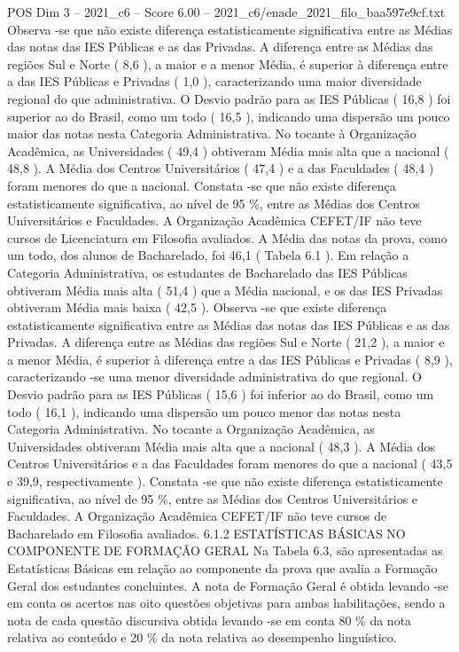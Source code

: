 \begin{textsample}{POS Dim 3 – 2021\_c6 – Score 6.00 – 2021\_c6/enade\_2021\_filo\_baa597e9cf.txt}
Observa -se que não existe diferença estatisticamente significativa entre as Médias das notas das IES Públicas e as das Privadas.
A diferença entre as Médias das regiões Sul e Norte ( 8,6 ), a maior e a menor Média, é superior à diferença entre a das IES Públicas e Privadas ( 1,0 ), caracterizando uma maior diversidade regional do que administrativa.
O Desvio padrão para as IES Públicas ( 16,8 ) foi superior ao do Brasil, como um todo ( 16,5 ), indicando uma dispersão um pouco maior das notas nesta Categoria Administrativa.
No tocante à Organização Acadêmica, as Universidades ( 49,4 ) obtiveram Média mais alta que a nacional ( 48,8 ).
A Média dos Centros Universitários ( 47,4 ) e a das Faculdades ( 48,4 ) foram menores do que a nacional.
Constata -se que não existe diferença estatisticamente significativa, ao nível de 95 \%, entre as Médias dos Centros Universitários e Faculdades.
A Organização Acadêmica CEFET/IF não teve cursos de Licenciatura em Filosofia avaliados.
A Média das notas da prova, como um todo, dos alunos de Bacharelado, foi 46,1 ( Tabela 6.1 ).
Em relação a Categoria Administrativa, os estudantes de Bacharelado das IES Públicas obtiveram Média mais alta ( 51,4 ) que a Média nacional, e os das IES Privadas obtiveram Média mais baixa ( 42,5 ).
Observa -se que existe diferença estatisticamente significativa entre as Médias das notas das IES Públicas e as das Privadas.
A diferença entre as Médias das regiões Sul e Norte ( 21,2 ), a maior e a menor Média, é superior à diferença entre a das IES Públicas e Privadas ( 8,9 ), caracterizando -se uma menor diversidade administrativa do que regional.
O Desvio padrão para as IES Públicas ( 15,6 ) foi inferior ao do Brasil, como um todo ( 16,1 ), indicando uma dispersão um pouco menor das notas nesta Categoria Administrativa.
No tocante a Organização Acadêmica, as Universidades obtiveram Média mais alta que a nacional ( 48,3 ).
A Média dos Centros Universitários e a das Faculdades foram menores do que a nacional ( 43,5 e 39,9, respectivamente ).
Constata -se que não existe diferença estatisticamente significativa, ao nível de 95 \%, entre as Médias dos Centros Universitários e Faculdades.
A Organização Acadêmica CEFET/IF não teve cursos de Bacharelado em Filosofia avaliados. 6.1.2 ESTATÍSTICAS BÁSICAS NO COMPONENTE DE FORMAÇÃO GERAL Na Tabela 6.3, são apresentadas as Estatísticas Básicas em relação ao componente da prova que avalia a Formação Geral dos estudantes concluintes.
A nota de Formação Geral é obtida levando -se em conta os acertos nas oito questões objetivas para ambas habilitações, sendo a nota de cada questão discursiva obtida levando -se em conta 80 \% da nota relativa ao conteúdo e 20 \% da nota relativa ao desempenho linguístico.

\end{textsample}

